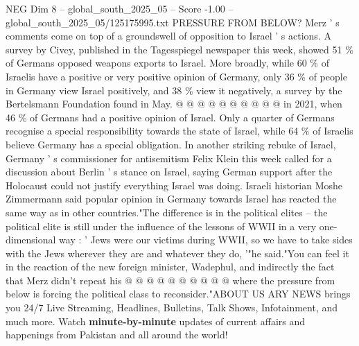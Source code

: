 \begin{textsample}{NEG Dim 8 – global\_south\_2025\_05 – Score -1.00 – global\_south\_2025\_05/125175995.txt}
PRESSURE FROM BELOW?
Merz ' s comments come on top of a groundswell of opposition to Israel ' s actions.
A survey by Civey, published in the Tagesspiegel newspaper this week, showed 51 \% of Germans opposed weapons exports to Israel.
More broadly, while 60 \% of Israelis have a positive or very positive opinion of Germany, only 36 \% of people in Germany view Israel positively, and 38 \% view it negatively, a survey by the Bertelsmann Foundation found in May. @ @ @ @ @ @ @ @ @ @ in 2021, when 46 \% of Germans had a positive opinion of Israel.
Only a quarter of Germans recognise a special responsibility towards the state of Israel, while 64 \% of Israelis believe Germany has a special obligation.
In another striking rebuke of Israel, Germany ' s commissioner for antisemitism Felix Klein this week called for a discussion about Berlin ' s stance on Israel, saying German support after the Holocaust could not justify everything Israel was doing.
Israeli historian Moshe Zimmermann said popular opinion in Germany towards Israel has reacted the same way as in other countries."The difference is in the political elites -- the political elite is still under the influence of the lessons of WWII in a very one-dimensional way : ' Jews were our victims during WWII, so we have to take sides with the Jews wherever they are and whatever they do, '"he said."You can feel it in the reaction of the new foreign minister, Wadephul, and indirectly the fact that Merz didn't repeat his @ @ @ @ @ @ @ @ @ @ where the pressure from below is forcing the political class to reconsider."ABOUT US ARY NEWS brings you 24/7 Live Streaming, Headlines, Bulletins, Talk Shows, Infotainment, and much more.
Watch \textbf{minute-by-minute} updates of current affairs and happenings from Pakistan and all around the world!

\end{textsample}
